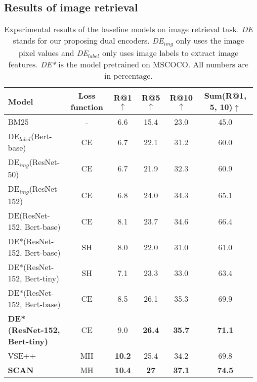 \documentclass[11pt,a4paper]{article}
\begin{document}
\subsection{Results of image retrieval}

\begin{table*}[t]
\caption{Experimental results of the baseline models on image retrieval task. \textit{DE} stands for our proposing dual encoders. \textit{DE$_{img}$} only uses the image pixel values and \textit{DE$_{label}$} only uses image labels to extract image features. \textit{DE*} is the model pretrained on MSCOCO. All numbers are in percentage.} \label{tab:results}
\centering
\small
\begin{tabular}{l|c|c|c|c|c}
\hline
{\textbf{Model}} & \textbf{Loss function} & \textbf{R@1} $\uparrow$ & \textbf{R@5} $\uparrow$ & \textbf{R@10} $\uparrow$ & \textbf{Sum(R@1, 5, 10)}$\uparrow$ \\ \hline
BM25 & - & 6.6 & 15.4 & 23.0 & 45.0 \\ \hline  \hline
DE$_{label}$(Bert-base) & CE & 6.7 & 22.1 & 31.2 & 60.0 \\ \hline
DE$_{img}$(ResNet-50) & CE & 6.7 & 21.9	& 32.3 & 60.9  \\ \hline
DE$_{img}$(ResNet-152) & CE & 6.8 & 24.0 & 34.3 & 65.1 \\ \hline
DE(ResNet-152, Bert-base) & CE & 8.1 & 23.7 & 34.6 & 66.4 \\ \hline
DE*(ResNet-152, Bert-base) & SH & 8.0 & 22.0 & 31.0 & 61.0 \\ \hline
DE*(ResNet-152, Bert-tiny) & SH & 7.1 & 23.3 & 33.0 & 63.4 \\ \hline
DE*(ResNet-152, Bert-base) & CE & 8.5 & 26.1 & 35.3 & 69.9 \\ \hline
\textbf{DE*(ResNet-152, Bert-tiny)} & CE & 9.0 &  \textbf{26.4} & \textbf{35.7} & \textbf{71.1} \\ \hline 
VSE++ & MH & \textbf{10.2} & 25.4 & 34.2 & 69.8  \\ \hline \hline
\textbf{SCAN} & MH & \textbf{10.4} & \textbf{27} & \textbf{37.1} & \textbf{74.5} \\ \hline
\end{tabular}
\vspace{-3mm}
\end{table*}
\end{document}
